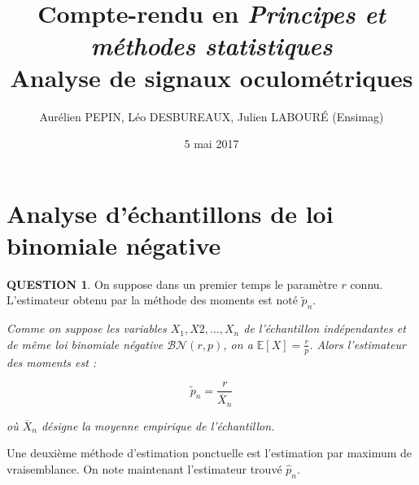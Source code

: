 \documentclass[a4paper,11pt]{article}
\title{Compte-rendu en \textit{Principes et méthodes statistiques} \\
\textbf{Analyse de signaux oculométriques}}
\author{Aurélien PEPIN, Léo DESBUREAUX, Julien LABOUR\'{E} (Ensimag)}
\date{5 mai 2017}
\newcommand{\quest}[1]{\small\textbf{#1}\normalsize}
\theoremstyle{nonumberplain}
\theoremstyle{nonumberplain}
\theoremstyle{nonumberplain}
\theoremstyle{nonumberplain}
\begin{document}
\maketitle

\section{Analyse d'échantillons de loi binomiale négative}

    \quest{QUESTION 1}. On suppose dans un premier temps le paramètre $r$ connu. L'estimateur
    obtenu par la méthode des moments est noté $\tilde{p}_n$.

    \begin{calculs}
        \hspace{-1ex}\emph{Comme on suppose les variables $X_1, X2, ..., X_n$ de l'échantillon indépendantes
        et de même loi binomiale négative $\mathcal{BN}(r, p)$, on a $\mathbb{E}[X] = \frac{r}{p}$. Alors
        l'estimateur des moments est :}

        $$\tilde{p}_n = \frac{r}{\overline{X}_n}$$

        \emph{où $\overline{X}_n$ désigne la moyenne empirique de l'échantillon.}
    \end{calculs}

    Une deuxième méthode d'estimation ponctuelle est l'estimation par maximum de
    vraisemblance. On note maintenant l'estimateur trouvé $\hat{p}_n$.
\end{document}
